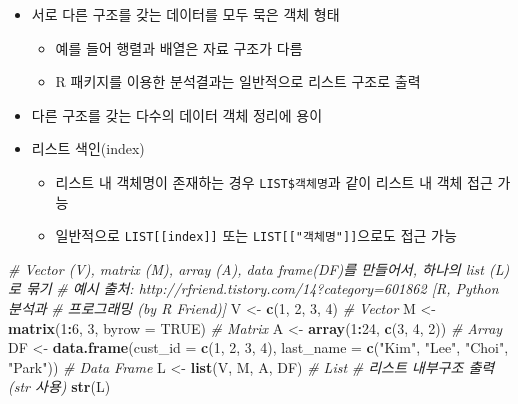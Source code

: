 \documentclass[11pt,a4paper]{book}
\newenvironment{Shaded}{\begin{snugshade}}{\end{snugshade}}
\newcommand{\KeywordTok}[1]{\textcolor[rgb]{0.13,0.29,0.53}{\textbf{#1}}}
\newcommand{\DataTypeTok}[1]{\textcolor[rgb]{0.13,0.29,0.53}{#1}}
\newcommand{\DecValTok}[1]{\textcolor[rgb]{0.00,0.00,0.81}{#1}}
\newcommand{\StringTok}[1]{\textcolor[rgb]{0.31,0.60,0.02}{#1}}
\newcommand{\CommentTok}[1]{\textcolor[rgb]{0.56,0.35,0.01}{\textit{#1}}}
\newcommand{\OtherTok}[1]{\textcolor[rgb]{0.56,0.35,0.01}{#1}}
\newcommand{\OperatorTok}[1]{\textcolor[rgb]{0.81,0.36,0.00}{\textbf{#1}}}
\newcommand{\NormalTok}[1]{#1}
\providecommand{\tightlist}{%
  \setlength{\itemsep}{0pt}\setlength{\parskip}{0pt}}
\theoremstyle{definition}
\theoremstyle{definition}
\theoremstyle{definition}
\theoremstyle{remark}
\begin{document}
\begin{itemize}
\tightlist
\item
  서로 다른 구조를 갖는 데이터를 모두 묵은 객체 형태

  \begin{itemize}
  \tightlist
  \item
    예를 들어 행렬과 배열은 자료 구조가 다름
  \item
    R 패키지를 이용한 분석결과는 일반적으로 리스트 구조로 출력
  \end{itemize}
\item
  다른 구조를 갖는 다수의 데이터 객체 정리에 용이
\item
  리스트 색인(index)

  \begin{itemize}
  \tightlist
  \item
    리스트 내 객체명이 존재하는 경우 \texttt{LIST\$객체명}과 같이 리스트
    내 객체 접근 가능
  \item
    일반적으로 \texttt{LIST{[}{[}index{]}{]}} 또는
    \texttt{LIST{[}{[}"객체명"{]}{]}}으로도 접근 가능
  \end{itemize}
\end{itemize}

\footnotesize

\begin{Shaded}
\begin{Highlighting}[]
\CommentTok{# Vector (V), matrix (M), array (A), data frame(DF)를 만들어서, 하나의 list (L)로 묶기}
\CommentTok{# 예시 출처: http://rfriend.tistory.com/14?category=601862 [R, Python 분석과}
\CommentTok{# 프로그래밍 (by R Friend)]}
\NormalTok{V <-}\StringTok{ }\KeywordTok{c}\NormalTok{(}\DecValTok{1}\NormalTok{, }\DecValTok{2}\NormalTok{, }\DecValTok{3}\NormalTok{, }\DecValTok{4}\NormalTok{)  }\CommentTok{# Vector}
\NormalTok{M <-}\StringTok{ }\KeywordTok{matrix}\NormalTok{(}\DecValTok{1}\OperatorTok{:}\DecValTok{6}\NormalTok{, }\DecValTok{3}\NormalTok{, }\DataTypeTok{byrow =} \OtherTok{TRUE}\NormalTok{)  }\CommentTok{# Matrix}
\NormalTok{A <-}\StringTok{ }\KeywordTok{array}\NormalTok{(}\DecValTok{1}\OperatorTok{:}\DecValTok{24}\NormalTok{, }\KeywordTok{c}\NormalTok{(}\DecValTok{3}\NormalTok{, }\DecValTok{4}\NormalTok{, }\DecValTok{2}\NormalTok{))  }\CommentTok{# Array}
\NormalTok{DF <-}\StringTok{ }\KeywordTok{data.frame}\NormalTok{(}\DataTypeTok{cust_id =} \KeywordTok{c}\NormalTok{(}\DecValTok{1}\NormalTok{, }\DecValTok{2}\NormalTok{, }\DecValTok{3}\NormalTok{, }\DecValTok{4}\NormalTok{), }\DataTypeTok{last_name =} \KeywordTok{c}\NormalTok{(}\StringTok{"Kim"}\NormalTok{, }\StringTok{"Lee"}\NormalTok{, }\StringTok{"Choi"}\NormalTok{, }\StringTok{"Park"}\NormalTok{))  }\CommentTok{# Data Frame}
\NormalTok{L <-}\StringTok{ }\KeywordTok{list}\NormalTok{(V, M, A, DF)  }\CommentTok{# List}
\CommentTok{# 리스트 내부구조 출력(str 사용)}
\KeywordTok{str}\NormalTok{(L)}
\end{Highlighting}
\end{Shaded}
\end{document}
